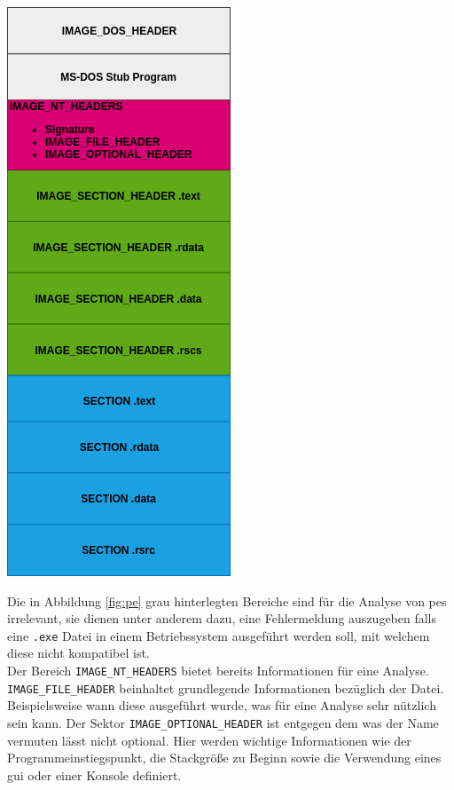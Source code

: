 \documentclass[
    12pt, %
    DIV10,
    ngerman, %
    a4paper, %
    oneside, %
    titlepage, %
    parskip=half, %
    headings=normal, %
    listof=totoc, %
    bibliography=totoc, %
    index=totoc, %
    captions=tableheading, %
    final %
]{scrreprt}
\begin{document}
\begin{center}
\includegraphics[scale=0.5]{img/pe.png}
\label{fig:pe}
\end{center}
Die in Abbildung \ref{fig:pe} grau hinterlegten Bereiche sind für die Analyse von \ac{pes} irrelevant, sie dienen unter anderem dazu, eine Fehlermeldung auszugeben falls eine \texttt{.exe} Datei in einem Betriebssystem ausgeführt werden soll, mit welchem diese nicht kompatibel ist.\\
Der Bereich \texttt{IMAGE\_NT\_HEADERS} bietet bereits Informationen für eine Analyse. \texttt{IMAGE\_FILE\_HEADER} beinhaltet grundlegende Informationen bezüglich der Datei. Beispielsweise wann diese ausgeführt wurde, was für eine Analyse sehr nützlich sein kann. Der Sektor \texttt{IMAGE\_OPTIONAL\_HEADER} ist entgegen dem was der Name vermuten lässt nicht optional. Hier werden wichtige Informationen wie der Programmeinstiegspunkt, die Stackgrö{\ss}e zu Beginn sowie die Verwendung eines \ac{gui} oder einer Konsole definiert.\\
\end{document}

